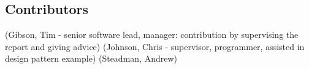 \subsection*{Contributors}

(Gibson, Tim - senior software lead, manager: contribution by supervising the report and giving advice) 
(Johnson, Chris - supervisor, programmer, assisted in design pattern example)
(Steadman, Andrew)

\newpage